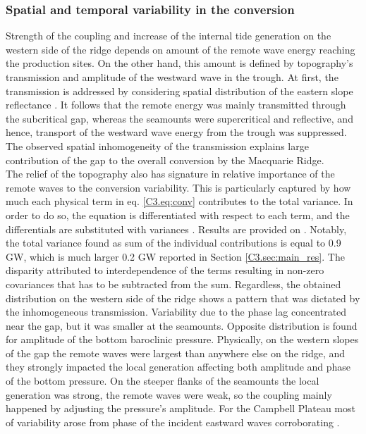 \documentclass[12pt]{article}
\begin{document}
\subsubsection{Spatial and temporal variability in the conversion}
\label{C3.sec:spat_conv}
Strength of the coupling and increase of the internal tide generation on the western side of the 
ridge  
depends on amount of the remote wave energy reaching the production sites. On the other hand, 
this amount is defined by topography's transmission and amplitude of the westward wave in the 
trough. At 
first, the transmission is addressed by considering spatial distribution of the eastern slope 
reflectance 
. It follows that the remote energy was mainly transmitted through the 
subcritical gap, 
whereas the seamounts were supercritical and reflective, and hence, transport of the 
westward wave energy from the trough was suppressed. The observed spatial inhomogeneity of the 
transmission 
explains large contribution of the gap to the overall conversion by the Macquarie Ridge.\\

The relief of the topography also has signature in relative importance of the remote waves to the 
conversion variability. This is particularly captured by how much each physical term in eq. 
\eqref{C3.eq:conv} contributes to the total variance. In order to do so, the equation is 
differentiated with respect to each term, and the differentials are substituted with variances 
\citep{kerry2014impact}. Results are provided on . Notably, the total 
variance found as sum of the individual contributions is equal to 0.9 GW, which is much larger 
0.2 GW reported in Section \ref{C3.sec:main_res}. The disparity attributed to 
interdependence of the terms resulting in non-zero covariances that has to be 
subtracted from the sum. Regardless, the obtained distribution on the western side of the ridge  
shows a pattern that was dictated by the inhomogeneous transmission. Variability due to 
the 
phase lag concentrated near the gap, but it was smaller at the 
seamounts. Opposite distribution is found for amplitude of the bottom baroclinic pressure. 
Physically, on the western slopes of the gap the remote waves were largest than anywhere else 
on the ridge, and they strongly impacted the local generation affecting both amplitude and phase of 
the 
bottom pressure. On the steeper flanks of the seamounts the local generation was strong, 
the remote waves were weak, so the coupling mainly happened by adjusting the pressure's 
amplitude. For the Campbell Plateau most of variability arose from phase of the incident 
eastward waves corroborating .\\
\end{document}
